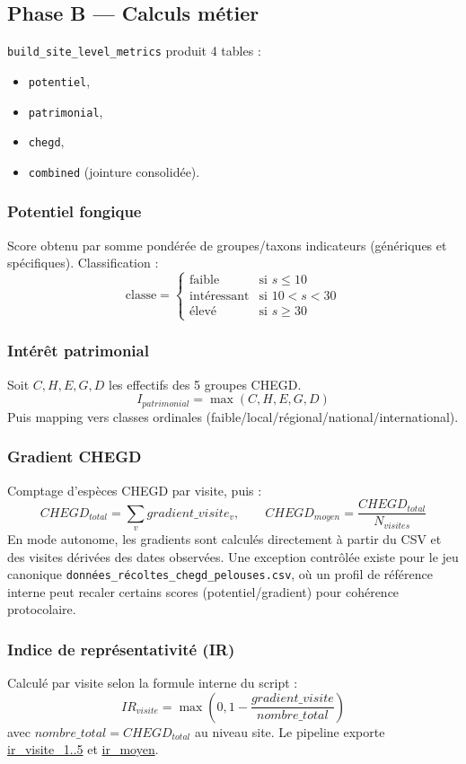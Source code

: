 \documentclass[11pt,a4paper]{article}
\begin{document}
\subsection{Phase B --- Calculs m\'etier}
\texttt{build\_site\_level\_metrics} produit 4 tables :
\begin{itemize}[leftmargin=1.2cm]
  \item \texttt{potentiel},
  \item \texttt{patrimonial},
  \item \texttt{chegd},
  \item \texttt{combined} (jointure consolid\'ee).
\end{itemize}

\subsubsection{Potentiel fongique}
Score obtenu par somme pond\'er\'ee de groupes/taxons indicateurs (g\'en\'eriques et sp\'ecifiques).
Classification :
\[
\text{classe}=
\begin{cases}
\text{faible} & \text{si } s\le 10\\
\text{int\'eressant} & \text{si } 10<s<30\\
\text{\'elev\'e} & \text{si } s\ge 30
\end{cases}
\]

\subsubsection{Int\'erêt patrimonial}
Soit $C,H,E,G,D$ les effectifs des 5 groupes CHEGD.
\[
I_{patrimonial}=\max(C,H,E,G,D)
\]
Puis mapping vers classes ordinales (faible/local/r\'egional/national/international).

\subsubsection{Gradient CHEGD}
Comptage d'espèces CHEGD par visite, puis :
\[
CHEGD_{total}=\sum_{v} gradient\_visite_v,
\qquad
CHEGD_{moyen}=\frac{CHEGD_{total}}{N_{visites}}
\]
En mode autonome, les gradients sont calcul\'es directement à partir du CSV et des visites
d\'eriv\'ees des dates observ\'ees. Une exception contrôl\'ee existe pour le jeu canonique
\texttt{donn\'ees\_r\'ecoltes\_chegd\_pelouses.csv}, où un profil de r\'ef\'erence interne peut
recaler certains scores (potentiel/gradient) pour coh\'erence protocolaire.

\subsubsection{Indice de repr\'esentativit\'e (IR)}
Calcul\'e par visite selon la formule interne du script :
\[
IR_{visite}=\max\left(0,1-\frac{gradient\_visite}{nombre\_total}\right)
\]
avec \(nombre\_total = CHEGD_{total}\) au niveau site.
Le pipeline exporte \url{ir_visite_1..5} et \url{ir_moyen}.
\end{document}
